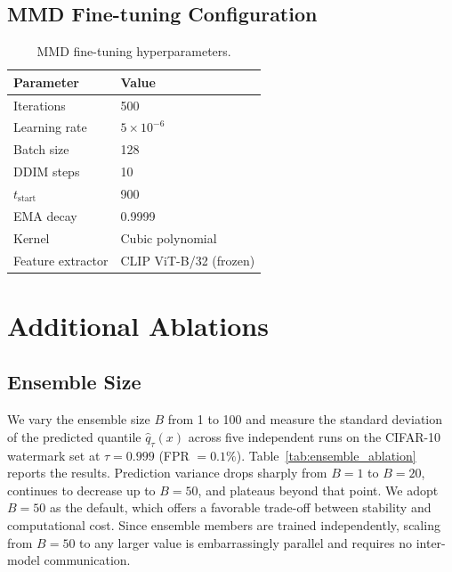 \documentclass[sigconf, review, anonymous]{acmart}
\begin{document}
\subsection{MMD Fine-tuning Configuration}

\begin{table}[h]
\caption{MMD fine-tuning hyperparameters.}
\begin{center}
\begin{tabular}{ll}
\toprule
Parameter & Value \\
\midrule
Iterations & 500 \\
Learning rate & $5 \times 10^{-6}$ \\
Batch size & 128 \\
DDIM steps & 10 \\
$t_{\text{start}}$ & 900 \\
EMA decay & 0.9999 \\
Kernel & Cubic polynomial \\
Feature extractor & CLIP ViT-B/32 (frozen) \\
\bottomrule
\end{tabular}
\end{center}
\end{table}

\section{Additional Ablations}
\label{app:ablation}

\subsection{Ensemble Size}

We vary the ensemble size $B$ from 1 to 100 and measure the standard deviation of the predicted quantile $\hat{q}_\tau(x)$ across five independent runs on the CIFAR-10 watermark set at $\tau = 0.999$ (FPR $= 0.1\%$). Table~\ref{tab:ensemble_ablation} reports the results. Prediction variance drops sharply from $B = 1$ to $B = 20$, continues to decrease up to $B = 50$, and plateaus beyond that point. We adopt $B = 50$ as the default, which offers a favorable trade-off between stability and computational cost. Since ensemble members are trained independently, scaling from $B = 50$ to any larger value is embarrassingly parallel and requires no inter-model communication.
\end{document}
